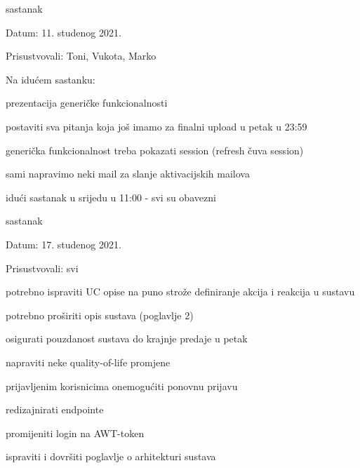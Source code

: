 \begin{packed_enum}
            \bigskip
            \noindent \item[\mylabel{itm61}{6.1.}]  sastanak
            \item[] \begin{packed_item}
                \item Datum: 11. studenog 2021.
                \item Prisustvovali: Toni, Vukota, Marko
                \item Na idućem sastanku: 
                \item[] \begin{packed_item}
                    \item prezentacija generičke funkcionalnosti
                    \item postaviti sva pitanja koja još imamo za finalni upload u petak u 23:59
                	\item generička funkcionalnost treba pokazati session (refresh čuva session)
                	\item sami napravimo neki mail za slanje aktivacijskih mailova
                	\item idući sastanak u srijedu u 11:00 - svi su obavezni
                \end{packed_item}
		    \end{packed_item}
	
	        \bigskip
	        \item sastanak
	        \item[] \begin{packed_item}
	           \item Datum: 17. studenog 2021.
	           \item Prisustvovali: svi
	           \item potrebno ispraviti UC opise na puno strože definiranje akcija i reakcija u sustavu
	            \item potrebno proširiti opis sustava (poglavlje 2)
            	\item osigurati pouzdanost sustava do krajnje predaje u petak
            	\item napraviti neke quality-of-life promjene
        		\item prijavljenim korisnicima onemogućiti ponovnu prijavu
        		\item redizajnirati endpointe
        		\item promijeniti login na AWT-token
            	\item ispraviti i dovršiti poglavlje o arhitekturi sustava
	        \end{packed_item}
	
		
		\end{packed_enum}
		

